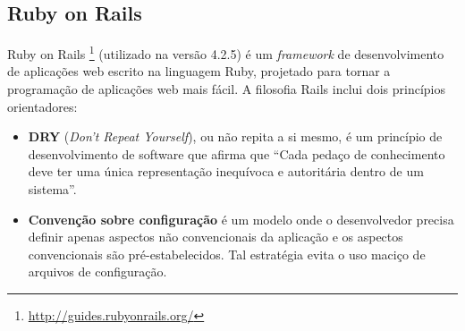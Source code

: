 \subsection{Ruby on Rails}

Ruby on Rails \footnote{\url{http://guides.rubyonrails.org/}} (utilizado na versão 4.2.5) é um \textit{framework} de desenvolvimento de aplicações web escrito na linguagem Ruby, projetado para tornar a programação de aplicações web mais fácil. A filosofia Rails inclui dois princípios orientadores:

\begin{itemize}
	\item \textbf{DRY} (\textit{Don't Repeat Yourself}), ou não repita a si mesmo, é um princípio de desenvolvimento de software que afirma que ``Cada pedaço de conhecimento deve ter uma única representação inequívoca e autoritária dentro de um sistema''\cite{wilson2012practices}.

	\item \textbf{Convenção sobre configuração} é um modelo onde o desenvolvedor precisa definir apenas aspectos não convencionais da aplicação e os aspectos convencionais são pré-estabelecidos. Tal estratégia evita o uso maciço de arquivos de configuração.
\end{itemize}
